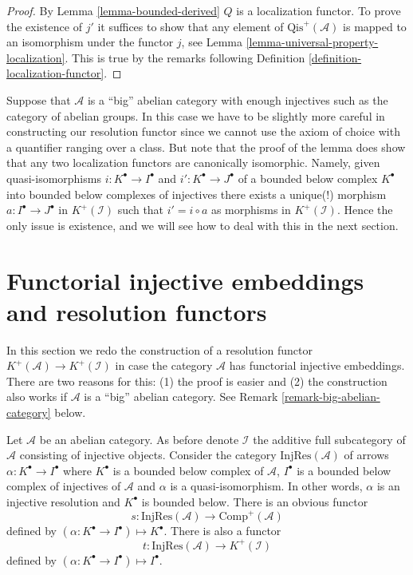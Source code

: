\begin{proof}
By
Lemma \ref{lemma-bounded-derived}
$Q$ is a localization functor.
To prove the existence of $j'$ it suffices to show that any element of
$\text{Qis}^{+}(\mathcal{A})$ is mapped to an isomorphism under
the functor $j$, see
Lemma \ref{lemma-universal-property-localization}.
This is true by the remarks following
Definition \ref{definition-localization-functor}.
\end{proof}

\begin{remark}
\label{remark-big-localization}
Suppose that $\mathcal{A}$ is a ``big'' abelian category with enough injectives
such as the category of abelian groups. In this case we have to be slightly
more careful in constructing our resolution functor since we cannot use
the axiom of choice with a quantifier ranging over a class. But note that
the proof of the lemma does show that any two localization functors are
canonically isomorphic. Namely, given quasi-isomorphisms
$i : K^\bullet \to I^\bullet$ and $i' : K^\bullet \to J^\bullet$ of
a bounded below complex $K^\bullet$ into bounded below complexes of injectives
there exists a unique(!) morphism $a : I^\bullet \to J^\bullet$
in $K^{+}(\mathcal{I})$ such that $i' = i \circ a$ as morphisms in
$K^{+}(\mathcal{I})$. Hence the only issue is existence, and we will see how
to deal with this in the next section.
\end{remark}










\section{Functorial injective embeddings and resolution functors}
\label{section-functorial-injective-resolutions}

\noindent
In this section we redo the construction of a resolution functor
$K^{+}(\mathcal{A}) \to K^{+}(\mathcal{I})$ in case the
category $\mathcal{A}$ has functorial injective embeddings.
There are two reasons for this: (1) the proof is easier and (2)
the construction also works if $\mathcal{A}$ is a ``big'' abelian
category. See
Remark \ref{remark-big-abelian-category}
below.

\medskip\noindent
Let $\mathcal{A}$ be an abelian category. As before denote $\mathcal{I}$
the additive full subcategory of $\mathcal{A}$ consisting of injective
objects. Consider the category $\text{InjRes}(\mathcal{A})$
of arrows $\alpha : K^\bullet \to I^\bullet$
where $K^\bullet$ is a bounded below complex of $\mathcal{A}$,
$I^\bullet$ is a bounded below complex of injectives of $\mathcal{A}$
and $\alpha$ is a quasi-isomorphism. In other words, $\alpha$ is
an injective resolution and $K^\bullet$ is bounded below.
There is an obvious functor
$$
s : \text{InjRes}(\mathcal{A}) \longrightarrow \text{Comp}^{+}(\mathcal{A})
$$
defined by $(\alpha : K^\bullet \to I^\bullet) \mapsto K^\bullet$.
There is also a functor
$$
t : \text{InjRes}(\mathcal{A}) \longrightarrow K^{+}(\mathcal{I})
$$
defined by $(\alpha : K^\bullet \to I^\bullet) \mapsto I^\bullet$.

